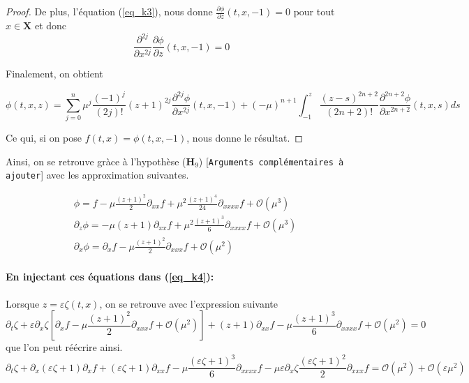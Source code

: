 \documentclass[12pt,a4paper]{article}
\numberwithin{equation}{section}
\begin{document}
\begin{proof}
De plus, l'équation (\ref{eq_k3}), nous donne $\frac{\partial \phi}{\partial z}(t,x,-1) = 0$ pour tout $x\in \textbf{X}$ et donc 
\begin{equation*}
    \frac{\partial^{2j}}{\partial x^{2j}}\frac{\partial \phi}{\partial z}(t,x,-1) = 0
\end{equation*}

Finalement, on obtient

    \begin{equation*}
        \phi (t,x,z) = \sum_{j = 0}^{n} \mu^j\frac{(-1)^j}{(2j)!} (z+1)^{2j}\frac{\partial^{2j}\phi}{\partial x^{2j}}(t,x,-1)
        + (-\mu)^{n+1}\int_{-1}^z\frac{(z-s)^{2n+2}}{(2n+2)!}\frac{\partial^{2n+2} \phi}{\partial x^{2n+2}}(t,x,s)ds
    \end{equation*}


Ce qui, si on pose $f(t,x) = \phi(t,x,-1)$, nous donne le résultat.
\end{proof}

Ainsi, on se retrouve gràce à l'hypothèse ($\textbf{H}_9$) [\texttt{Arguments complémentaires à ajouter}] avec les approximation suivantes.

\begin{equation}
    \begin{split}
            &\phi = f - \mu\frac{(z+1)^2}{2}\partial_{xx}f + \mu^2\frac{(z+1)^4}{24}\partial_{xxxx}f + \mathcal{O}(\mu^3)\\
            &\partial_z\phi = -\mu(z+1)\partial_{xx}f + \mu^2\frac{(z+1)^3}{6}\partial_{xxxx}f + \mathcal{O}(\mu^3)\\
            &\partial_x\phi = \partial_xf - \mu\frac{(z+1)^2}{2}\partial_{xxx}f + \mathcal{O}(\mu^2)
    \end{split}
\end{equation}
\paragraph{En injectant ces équations dans (\ref{eq_k4}):}
Lorsque $z = \varepsilon \zeta(t,x)$, on se retrouve avec l'expression suivante
\begin{equation*}
    \partial_{t}\zeta +  \varepsilon \partial_{x} \zeta  \left[\partial_xf - \mu\frac{(z+1)^2}{2}\partial_{xxx}f + \mathcal{O}(\mu^2) \right]  +  (z+1) \partial_{xx}f - \mu\frac{(z+1)^3}{6}\partial_{xxxx}f + \mathcal{O}(\mu^2) = 0
\end{equation*}
que l'on peut réécrire ainsi.
\begin{equation*}
    \partial_{t}\zeta +  \partial_{x}(\varepsilon \zeta+1) \partial_xf+  (\varepsilon\zeta+1) \partial_{xx}f    - \mu\frac{(\varepsilon\zeta+1)^3}{6}\partial_{xxxx}f - \mu \varepsilon\partial_{x}\zeta\frac{(\varepsilon\zeta+1)^2}{2}\partial_{xxx}f= \mathcal{O}(\mu^2) + \mathcal{O}(\varepsilon\mu^2) 
\end{equation*}
\end{document}
